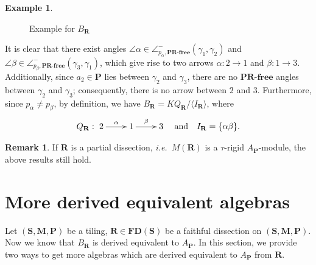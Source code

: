 \documentclass[a4paper,10pt]{amsart}
\theoremstyle{plain}          %
\theoremstyle{definition}
\newtheorem{rk}[theorem]{Remark}
\newtheorem{ex}[theorem]{Example}
\def\SS{\mathbf{S}}
\def\RR{\mathbf{R}}
\def\af{\mathbf{a}}
\def\MM{\mathbf{M}}
\def\PP{\mathbf{P}}
\def\MM{\mathbf{M}}
\newcommand{\ha}{\angle^-}
\newcommand{\FD}{\mathbf{FD}}
\newcommand{\ie}{{\em i.e.}\ }
\begin{document}
\begin{ex}
\begin{figure}[h]
\begin{minipage}[t]{0.4\textwidth}
      \end{minipage}
       \caption{Example for $B_{\RR}$}
       \label{f:example for A_R}
   \end{figure}
   
   It is clear that there exist angles $\angle\alpha\in\ha_{p_\alpha,\textbf{PR-free}}(\gamma_1,\gamma_2)$ and $\angle\beta\in\ha_{p_\beta,\textbf{PR-free}}(\gamma_3,\gamma_1)$, which give rise to two arrows $\alpha:2\to1$ and $\beta:1\to3$. Additionally, since $a_2\in\PP$ lies between $\gamma_2$ and $\gamma_3$, there are no $\textbf{PR-free}$ angles between $\gamma_2$ and $\gamma_3$; consequently, there is no arrow between $2$ and $3$. Furthermore, since $p_\alpha\ne p_\beta$, by definition, we have $B_{\RR}=KQ_{\RR}/\langle I_{\RR}\rangle$, where
  \[Q_{\RR}: \xymatrix{2\ar[r]^{\alpha}&1\ar[r]^{\beta}&3}\quad \text{and}\quad I_{\RR}=\{\alpha\beta\}.\]
\end{ex}
\begin{rk}
   If $\RR$ is a partial dissection, \ie $M(\RR)$ is a $\tau$-rigid $A_\PP$-module, the above results still hold.
\end{rk}





\section{More derived equivalent algebras}
Let $(\SS,\MM,\PP)$ be a tiling, $\RR\in \FD(\SS)$ be a faithful dissection on  $(\SS,\MM,\PP)$. Now we know that $B_{\RR}$ is derived equivalent to $A_{\PP}$. In this section, we provide two ways to get more algebras which are derived equivalent to $A_{\PP}$ from $\RR$.
\end{document}
